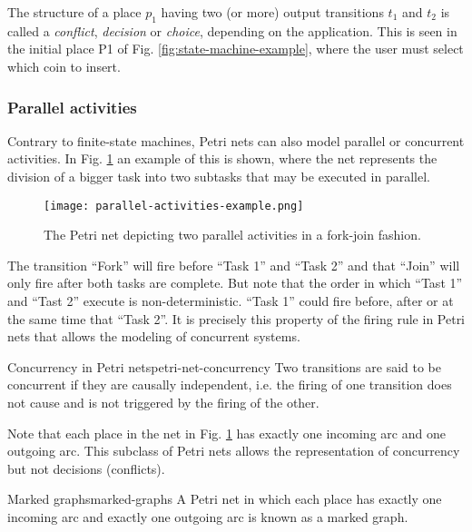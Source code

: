 \documentclass[../Thesis.tex]{subfiles}
\begin{document}
The structure of a place $p_1$ having two (or more) output transitions $t_1$ and $t_2$ is called
a \emph{conflict}, \emph{decision} or \emph{choice}, depending on the application.
This is seen in the initial place \uppercase{P1} of Fig. \ref{fig:state-machine-example},
where the user must select which coin to insert.

\subsubsection{Parallel activities}

Contrary to finite-state machines, Petri nets can also model parallel or concurrent activities.
In Fig. \ref{fig:parallel-activities-example} an example of this is shown,
where the net represents the division of a bigger task into two subtasks that may be executed in parallel.

\begin{figure}[H]
    \centering
    \texttt{[image: parallel-activities-example.png]}
    \caption{The Petri net depicting two parallel activities in a fork-join fashion.}
    \label{fig:parallel-activities-example}
\end{figure}

The transition ``Fork'' will fire before ``Task 1'' and ``Task 2''
and that ``Join'' will only fire after both tasks are complete.
But note that the order in which ``Tast 1'' and ``Tast 2'' execute is non-deterministic.
``Task 1'' could fire before, after or at the same time that ``Task 2''.
It is precisely this property of the firing rule in Petri nets that allows the modeling of concurrent systems.

\begin{definition}{Concurrency in Petri nets}{petri-net-concurrency}
    Two transitions are said to be concurrent if they are causally independent, i.e.
    the firing of one transition does not cause and is not triggered by the firing of the other.
\end{definition}

Note that each place in the net in Fig. \ref{fig:parallel-activities-example} has exactly one incoming arc
and one outgoing arc.
This subclass of Petri nets allows the representation of concurrency but not decisions (conflicts).

\begin{definition}{Marked graphs}{marked-graphs}
    A Petri net in which each place has exactly one incoming arc
    and exactly one outgoing arc is known as a marked graph.
\end{definition}
\end{document}
